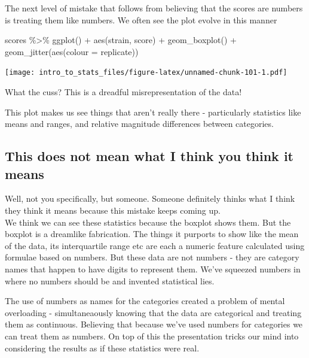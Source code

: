\documentclass[
]{book}
\newenvironment{Shaded}{\begin{snugshade}}{\end{snugshade}}
\newcommand{\AttributeTok}[1]{\textcolor[rgb]{0.77,0.63,0.00}{#1}}
\newcommand{\FunctionTok}[1]{\textcolor[rgb]{0.00,0.00,0.00}{#1}}
\newcommand{\NormalTok}[1]{#1}
\newcommand{\SpecialCharTok}[1]{\textcolor[rgb]{0.00,0.00,0.00}{#1}}
\begin{document}
The next level of mistake that follows from believing that the scores are numbers is treating them like numbers. We often see the plot evolve in this manner

\begin{Shaded}
\begin{Highlighting}[]
\NormalTok{scores }\SpecialCharTok{\%\textgreater{}\%} \FunctionTok{ggplot}\NormalTok{() }\SpecialCharTok{+} 
  \FunctionTok{aes}\NormalTok{(strain, score) }\SpecialCharTok{+} 
  \FunctionTok{geom\_boxplot}\NormalTok{() }\SpecialCharTok{+} 
  \FunctionTok{geom\_jitter}\NormalTok{(}\FunctionTok{aes}\NormalTok{(}\AttributeTok{colour =}\NormalTok{ replicate))}
\end{Highlighting}
\end{Shaded}

\texttt{[image: intro\_to\_stats\_files/figure-latex/unnamed-chunk-101-1.pdf]}

What the cuss? This is a dreadful misrepresentation of the data!

This plot makes us see things that aren't really there - particularly statistics like means and ranges, and relative magnitude differences between categories.

\hypertarget{this-does-not-mean-what-i-think-you-think-it-means}{%
\subsection{This does not mean what I think you think it means}\label{this-does-not-mean-what-i-think-you-think-it-means}}

Well, not you specifically, but someone. Someone definitely thinks what I think they think it means because this mistake keeps coming up.\\
We think we can see these statistics because the boxplot shows them. But the boxplot is a dreamlike fabrication. The things it purports to show like the mean of the data, its interquartile range etc are each a numeric feature calculated using formulae based on numbers. But these data are not numbers - they are category names that happen to have digits to represent them. We've squeezed numbers in where no numbers should be and invented statistical lies.

The use of numbers as names for the categories created a problem of mental overloading - simultaneaously knowing that the data are categorical and treating them as continuous. Believing that because we've used numbers for categories we can treat them as numbers. On top of this the presentation tricks our mind into considering the results as if these statistics were real.
\end{document}
